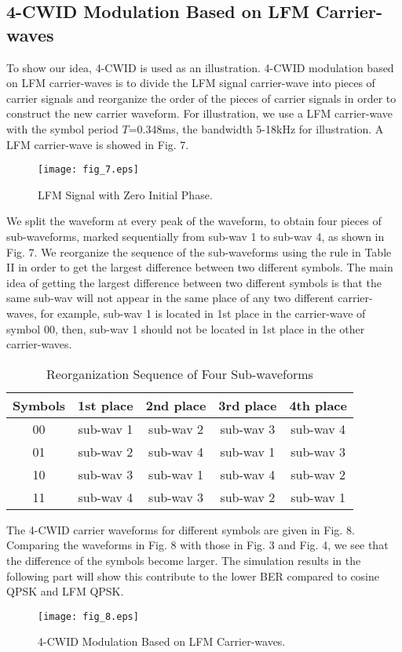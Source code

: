 \documentclass[journal]{IEEEtran}
\begin{document}
\subsection{4-CWID Modulation Based on LFM Carrier-waves}
To show our idea, 4-CWID is used as an illustration. 4-CWID
modulation based on LFM carrier-waves is to divide the LFM signal
carrier-wave into pieces of carrier signals and reorganize the order
of the pieces of carrier signals in order to construct the new
carrier waveform. For illustration, we use a LFM carrier-wave with
the symbol period $T$=0.348ms, the bandwidth 5-18kHz for
illustration. A LFM carrier-wave is showed in Fig. 7.
\begin{figure}[!t]
\centering
\texttt{[image: fig\_7.eps]}
\caption{LFM Signal with Zero Initial Phase.} \label{fig_sim}
\end{figure}
We split the waveform at every peak of the waveform, to obtain four
pieces of sub-waveforms, marked sequentially from sub-wav 1 to
sub-wav 4, as shown in Fig. 7. We reorganize the sequence of the
sub-waveforms using the rule in Table II in order to get the largest
difference between two different symbols. The main idea of getting
the largest difference between two different symbols is that the
same sub-wav will not appear in the same place of any two different
carrier-waves, for example, sub-wav 1 is located in 1st place in the
carrier-wave of symbol 00, then, sub-wav 1 should not be located in
1st place in the other carrier-waves.
\begin{table}[!t]
\renewcommand{\arraystretch}{1.3}
\caption{Reorganization Sequence of Four Sub-waveforms}
\label{table_example} \centering
\begin{tabular}{c||c||c||c||c}
\hline
\bfseries Symbols & \bfseries 1st place & \bfseries 2nd place & \bfseries 3rd place & \bfseries 4th place\\
\hline\hline
00            & sub-wav 1         & sub-wav 2       & sub-wav 3       & sub-wav 4\\
01            & sub-wav 2         & sub-wav 4       & sub-wav 1       & sub-wav 3\\
10            & sub-wav 3         & sub-wav 1       & sub-wav 4       & sub-wav 2\\
11            & sub-wav 4         & sub-wav 3       & sub-wav 2       & sub-wav 1\\
\hline
\end{tabular}
\end{table}

The 4-CWID carrier waveforms for different symbols are given in Fig.
8. Comparing the waveforms in Fig. 8 with those in Fig. 3 and Fig.
4, we see that the difference of the symbols become larger. The
simulation results in the following part will show this contribute
to the lower BER compared to cosine QPSK and LFM QPSK.
\begin{figure}[!t]
\centering
\texttt{[image: fig\_8.eps]}
\caption{4-CWID Modulation Based on LFM Carrier-waves.}
\label{fig_sim}
\end{figure}
\end{document}
